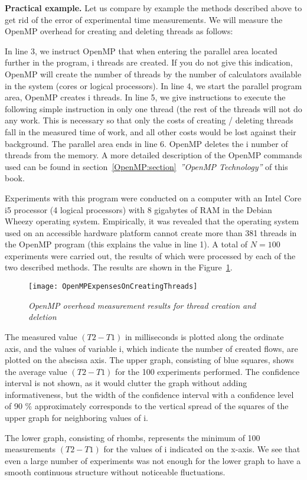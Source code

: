 {	\par\textbf{Practical example.} Let us compare by example the methods described above to get rid of the error of experimental time measurements. We will measure the OpenMP overhead for creating and deleting threads as follows:
	\begin{figure}[H]
		
	\end{figure}
	In line 3, we instruct OpenMP that when entering the parallel area located further in the program, i threads are created. If you do not give this indication, OpenMP will create the number of threads by the number of calculators available in the system (cores or logical processors). In line 4, we start the parallel program area, OpenMP creates i threads. In line 5, we give instructions to execute the following simple instruction in only one thread (the rest of the threads will not do any work. This is necessary so that only the costs of creating / deleting threads fall in the measured time of work, and all other costs would be lost against their background. The parallel area ends in line 6. OpenMP deletes the i number of  threads from the memory. A more detailed description of the OpenMP commands used can be found in section~\ref{OpenMP:section}~\textit{''OpenMP Technology''} of this book.
	\par Experiments with this program were conducted on a computer with an Intel Core i5 processor (4 logical processors) with 8 gigabytes of RAM in the Debian Wheezy operating system. Empirically, it was revealed that the operating system used on an accessible hardware platform cannot create more than 381 threads in the OpenMP program (this explains the value in line 1). A total of $N = 100$ experiments were carried out, the results of which were processed by each of the two described methods. The results are shown in the Figure~\ref{OpenMPExpensesOnCreatingThreads:image}.
	\begin{figure}[H]
		\texttt{[image: OpenMPExpensesOnCreatingThreads]}
		\caption{\textit{OpenMP overhead measurement results for thread creation and deletion}}
		\label{OpenMPExpensesOnCreatingThreads:image}
	\end{figure} 
	\par The measured value $(T2 - T1)$ in milliseconds is plotted along the ordinate axis, and the values of variable i, which indicate the number of created flows, are plotted on the abscissa axis. The upper graph, consisting of blue squares, shows the average value $(T2 - T1)$ for the 100 experiments performed. The confidence interval is not shown, as it would clutter the graph without adding informativeness, but the width of the confidence interval with a confidence level of 90 \% approximately corresponds to the vertical spread of the squares of the upper graph for neighboring values of i.
	\par The lower graph, consisting of rhombs, represents the minimum of 100 measurements $(T2 - T1)$ for the values of i indicated on the x-axis. We see that even a large number of experiments was not enough for the lower graph to have a smooth continuous structure without noticeable fluctuations.

}